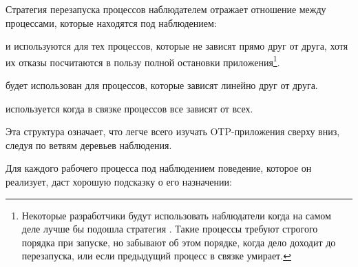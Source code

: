 Стратегия перезапуска процессов наблюдателем отражает отношение между процессами, которые находятся под наблюдением:

\begin{itemize*}
	\item {} и  используются для тех процессов, которые не зависят прямо друг от друга, хотя их отказы посчитаются в пользу полной остановки приложения\footnote{Некоторые разработчики будут использовать наблюдатели  когда на самом деле лучше бы подошла стратегия . Такие процессы требуют строгого порядка при запуске, но забывают об этом порядке, когда дело доходит до перезапуска, или если предыдущий процесс в связке умирает.}.
	\item {} будет использован для процессов, которые зависят линейно друг от друга.
	\item {} используется когда в связке процессов все зависят от всех.
\end{itemize*}

Эта структура означает, что легче всего изучать OTP-приложения сверху вниз, следуя по ветвям деревьев наблюдения.

Для каждого рабочего процесса под наблюдением поведение, которое он реализует, даст хорошую подсказку о его назначении:

